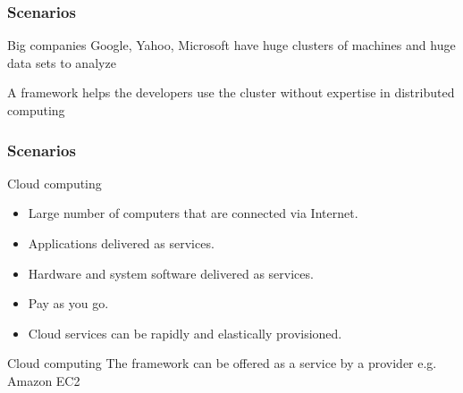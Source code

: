 \begin{frame}
  \frametitle{Scenarios}
\begin{block}{Big companies}
Google, Yahoo, Microsoft have huge clusters of machines and huge data sets to analyze

A framework helps the developers use the cluster without expertise in distributed computing
\end{block}

\end{frame}


\begin{frame}
  \frametitle{Scenarios}

\begin{block}{Cloud computing}
\begin{itemize}
\item Large number of computers that are connected via Internet.
\item Applications delivered as services.
\item Hardware and system software delivered as services.
\item Pay as you go.
\item Cloud services can be rapidly and elastically provisioned.

\end{itemize}
\end{block}
\begin{block}{Cloud computing}
 The framework can be offered as a service by a provider e.g. Amazon EC2
\end{block}
\end{frame}




